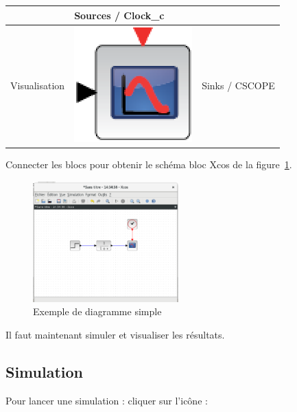 \begin{table}[!h]
\begin{tabular}{@{}P{4cm}P{6cm}P{4cm}@{}}
\begin{minipage}{6cm}
    \end{minipage} & 
    Sources / Clock\_c \\
    \midrule
    Visualisation & 
    \begin{minipage}{6cm}
    \centering
    \includegraphics[width=0.25\linewidth]{fig/scilab08.eps}
    \end{minipage} & 
    Sinks / CSCOPE \\
    \bottomrule
\end{tabular}
\end{table}
Connecter les blocs pour obtenir le schéma bloc Xcos de la 
figure~\ref{fig-simple}.
\begin{figure}
    \centering
    \includegraphics[width=0.5\textwidth]{fig/diagramme_simple.eps}
    \caption{Exemple de diagramme simple\label{fig-simple}}
\end{figure}
Il faut maintenant simuler et visualiser les résultats.  
\subsection{Simulation}
Pour lancer une simulation : cliquer sur l'icône : 

